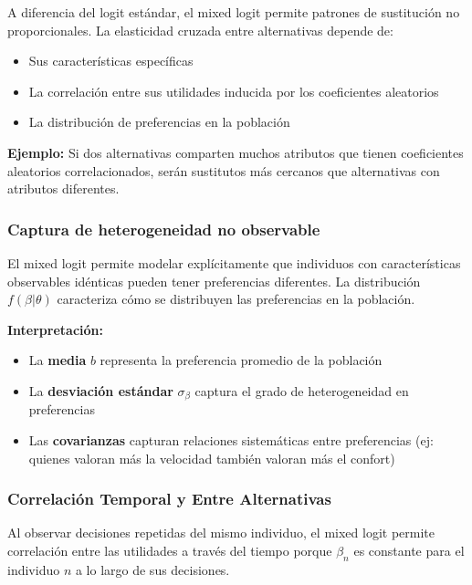 \documentclass[
]{book}
\providecommand{\tightlist}{%
  \setlength{\itemsep}{0pt}\setlength{\parskip}{0pt}}
\begin{document}
A diferencia del logit estándar, el mixed logit permite patrones de sustitución no proporcionales. La elasticidad cruzada entre alternativas depende de:

\begin{itemize}
\tightlist
\item
  Sus características específicas
\item
  La correlación entre sus utilidades inducida por los coeficientes aleatorios
\item
  La distribución de preferencias en la población
\end{itemize}

\textbf{Ejemplo:} Si dos alternativas comparten muchos atributos que tienen coeficientes aleatorios correlacionados, serán sustitutos más cercanos que alternativas con atributos diferentes.

\subsubsection{Captura de heterogeneidad no observable}\label{captura-de-heterogeneidad-no-observable}

El mixed logit permite modelar explícitamente que individuos con características observables idénticas pueden tener preferencias diferentes. La distribución \(f(\beta|\theta)\) caracteriza cómo se distribuyen las preferencias en la población.

\textbf{Interpretación:}

\begin{itemize}
\tightlist
\item
  La \textbf{media} \(b\) representa la preferencia promedio de la población
\item
  La \textbf{desviación estándar} \(\sigma_\beta\) captura el grado de heterogeneidad en preferencias
\item
  Las \textbf{covarianzas} capturan relaciones sistemáticas entre preferencias (ej: quienes valoran más la velocidad también valoran más el confort)
\end{itemize}

\subsubsection{Correlación Temporal y Entre Alternativas}\label{correlaciuxf3n-temporal-y-entre-alternativas}

Al observar decisiones repetidas del mismo individuo, el mixed logit permite correlación entre las utilidades a través del tiempo porque \(\beta_n\) es constante para el individuo \(n\) a lo largo de sus decisiones.
\end{document}
